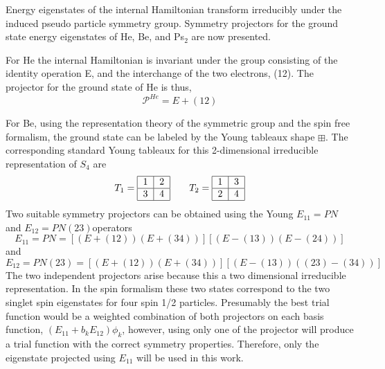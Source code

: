 \documentclass[12pt,thmsa,suthesis,verbatim]{report}
\begin{document}
Energy eigenstates of the internal Hamiltonian transform irreducibly under
the induced pseudo particle symmetry group. Symmetry projectors for the
ground state energy eigenstates of He, Be, and Ps$_2$ are now presented.

For He the internal Hamiltonian is invariant under the group consisting of
the identity operation E, and the interchange of the two electrons, (12).
The projector for the ground state of He is thus, 
\begin{equation}
\mathcal{P}^{He}=E+\left( 12\right)  \label{Heproj}
\end{equation}

For Be, using the representation theory of the symmetric group and the spin
free formalism\cite{Matson70}, the ground state can be labeled by the Young
tableaux shape $\boxplus $. The corresponding standard Young tableaux for
this 2-dimensional irreducible representation of $S_4$ are 
\[
T_1= 
\begin{tabular}{|l|l|}
\hline
1 & 2 \\ \hline
3 & 4 \\ \hline
\end{tabular}
\,\,\,\,\,\,\,\,\,\,\,\,T_2= 
\begin{tabular}{|l|l|}
\hline
1 & 3 \\ \hline
2 & 4 \\ \hline
\end{tabular}
\]
Two suitable symmetry projectors can be obtained using the Young $E_{11}=PN$
and $E_{12}=PN(23)$operators 
\begin{equation}
E_{11}=PN=\left[ \left( E+\left( 12\right) \right) \left( E+\left( 34\right)
\right) \right] \left[ \left( E-\left( 13\right) \right) \left( E-\left(
24\right) \right) \right]  \label{NP}
\end{equation}
and 
\begin{equation}
E_{12}=PN\left( 23\right) =\left[ \left( E+\left( 12\right) \right) \left(
E+\left( 34\right) \right) \right] \left[ \left( E-\left( 13\right) \right)
\left( \left( 23\right) -\left( 34\right) \right) \right]
\end{equation}
The two independent projectors arise because this a two dimensional
irreducible representation. In the spin formalism these two states
correspond to the two singlet spin eigenstates for four spin 1/2 particles.
Presumably the best trial function would be a weighted combination of both
projectors on each basis function, $\left( E_{11}+b_kE_{12}\right) \phi _k$,
however, using only one of the projector will produce a trial function with
the correct symmetry properties. Therefore, only the eigenstate projected
using $E_{11}$ will be used in this work.
\end{document}

